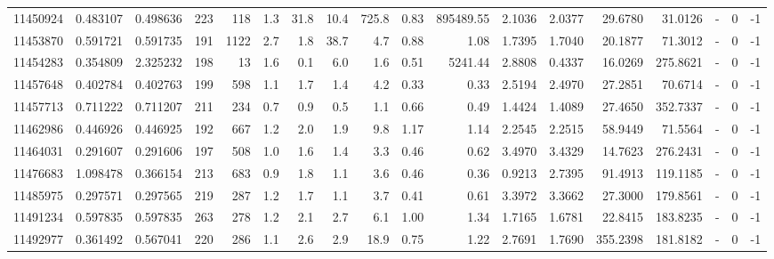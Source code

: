 \begin{tabular}{rrrrrrrrrrrrrrrlrr}
  11450924 & 0.483107 &   0.498636 &  223 &  118 &      1.3 &     31.8 &    10.4 &    725.8 &       0.83 &   895489.55 &  2.1036 &  2.0377 &   29.6780 &   31.0126 &             - &        0 &         -1 \\
  11453870 & 0.591721 &   0.591735 &  191 & 1122 &      2.7 &      1.8 &    38.7 &      4.7 &       0.88 &        1.08 &  1.7395 &  1.7040 &   20.1877 &   71.3012 &             - &        0 &         -1 \\
  11454283 & 0.354809 &   2.325232 &  198 &   13 &      1.6 &      0.1 &     6.0 &      1.6 &       0.51 &     5241.44 &  2.8808 &  0.4337 &   16.0269 &  275.8621 &             - &        0 &         -1 \\
  11457648 & 0.402784 &   0.402763 &  199 &  598 &      1.1 &      1.7 &     1.4 &      4.2 &       0.33 &        0.33 &  2.5194 &  2.4970 &   27.2851 &   70.6714 &             - &        0 &         -1 \\
  11457713 & 0.711222 &   0.711207 &  211 &  234 &      0.7 &      0.9 &     0.5 &      1.1 &       0.66 &        0.49 &  1.4424 &  1.4089 &   27.4650 &  352.7337 &             - &        0 &         -1 \\
  11462986 & 0.446926 &   0.446925 &  192 &  667 &      1.2 &      2.0 &     1.9 &      9.8 &       1.17 &        1.14 &  2.2545 &  2.2515 &   58.9449 &   71.5564 &             - &        0 &         -1 \\
  11464031 & 0.291607 &   0.291606 &  197 &  508 &      1.0 &      1.6 &     1.4 &      3.3 &       0.46 &        0.62 &  3.4970 &  3.4329 &   14.7623 &  276.2431 &             - &        0 &         -1 \\
  11476683 & 1.098478 &   0.366154 &  213 &  683 &      0.9 &      1.8 &     1.1 &      3.6 &       0.46 &        0.36 &  0.9213 &  2.7395 &   91.4913 &  119.1185 &             - &        0 &         -1 \\
  11485975 & 0.297571 &   0.297565 &  219 &  287 &      1.2 &      1.7 &     1.1 &      3.7 &       0.41 &        0.61 &  3.3972 &  3.3662 &   27.3000 &  179.8561 &             - &        0 &         -1 \\
  11491234 & 0.597835 &   0.597835 &  263 &  278 &      1.2 &      2.1 &     2.7 &      6.1 &       1.00 &        1.34 &  1.7165 &  1.6781 &   22.8415 &  183.8235 &             - &        0 &         -1 \\
  11492977 & 0.361492 &   0.567041 &  220 &  286 &      1.1 &      2.6 &     2.9 &     18.9 &       0.75 &        1.22 &  2.7691 &  1.7690 &  355.2398 &  181.8182 &             - &        0 &         -1 \\

\end{tabular}
